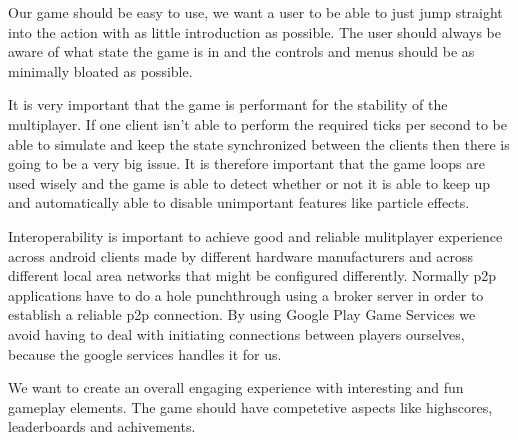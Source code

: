 	Our game should be easy to use, we want a user to be able to just jump straight into the action with as little introduction as possible. The user should always be aware of what state the game is in and the controls and menus should be as minimally bloated as possible.

	It is very important that the game is performant for the stability of the multiplayer. If one client isn't able to perform the required ticks per second to be able to simulate	and keep the state synchronized between the clients then there is going to be a very big issue. It is therefore important that the game loops are used wisely and the game is able to detect whether or not it is able to keep up and automatically able to disable unimportant features like particle effects.

	Interoperability is important to achieve good and reliable mulitplayer experience across android clients made by different hardware manufacturers and across different local area networks that might be configured differently. Normally p2p applications have to do a hole punchthrough using a broker server in order to establish a reliable p2p connection. By using Google Play Game Services we avoid having to deal with initiating connections between players ourselves, because the google services handles it for us.


	We want to create an overall engaging experience with interesting and fun gameplay elements. The game should have competetive aspects	like highscores, leaderboards and achivements.
